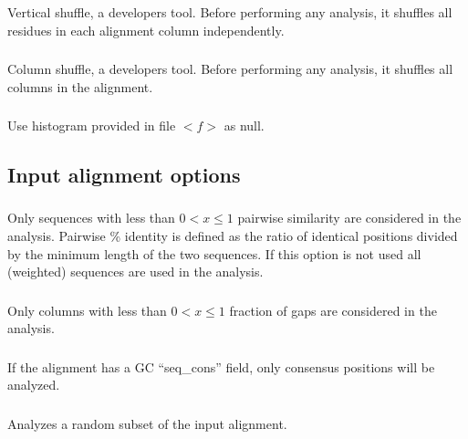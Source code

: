 \subsubsection{} Vertical shuffle, a developers tool. Before performing any analysis, it shuffles all residues in each alignment column independently.

\subsubsection{} Column shuffle, a developers tool. Before performing any analysis, it shuffles all columns in the alignment.

\subsubsection{} Use histogram provided in file $<f>$ as null. 



\subsection{Input alignment options}

\subsubsection{} Only sequences with less than $0<x\leq 1$
pairwise similarity are considered in the analysis.  Pairwise \%
identity is defined as the ratio of identical positions divided by the
minimum length of the two sequences. If this option is not used all
(weighted) sequences are used in the analysis.

\subsubsection{} Only columns with less than $0<x\leq 1$ fraction of gaps are considered in the analysis.

\subsubsection{} If the alignment has a GC ``seq\_cons'' field, only consensus positions will be analyzed.

\subsubsection{} Analyzes a random subset of the input alignment.

